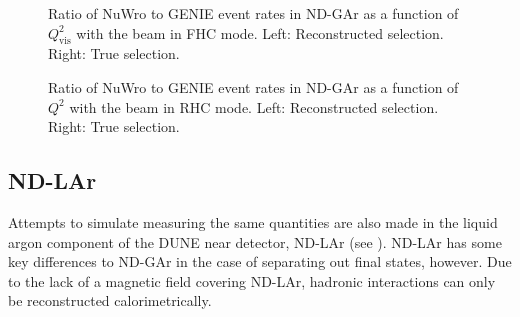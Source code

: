 \begin{figure}[h]
	\begin{minipage}[t]{.5\linewidth}
		\begin{adjustbox}{max totalsize=\linewidth, center}
			
		\end{adjustbox}
	\end{minipage}
 	\hfill
 	\begin{minipage}[t]{.5\linewidth}
 		\begin{adjustbox}{max totalsize=\linewidth, center}
 			
 		\end{adjustbox}
 	\end{minipage}
 	\caption[Comparison of NuWro and GENIE in $Q^{2}_{\textrm{vis}}$ for FHC]{Ratio of NuWro to GENIE event rates in ND-GAr as a function of $Q^{2}_{\textrm{vis}}$ with the beam in FHC mode. Left: Reconstructed selection. Right: True selection.}
 	\label{fig:Q2CompFhc}
\end{figure}

\begin{figure}[h]
	\begin{minipage}[t]{.5\linewidth}
		\begin{adjustbox}{max totalsize=\linewidth, center}
			
		\end{adjustbox}
	\end{minipage}
	\hfill
	\begin{minipage}[t]{.5\linewidth}
		\begin{adjustbox}{max totalsize=\linewidth, center}
			
		\end{adjustbox}
	\end{minipage}
	\caption[Comparison of NuWro and GENIE in $Q^{2}$ for RHC]{Ratio of NuWro to GENIE event rates in ND-GAr as a function of $Q^{2}$ with the beam in RHC mode. Left: Reconstructed selection. Right: True selection.}
	\label{fig:Q2CompRhc}
\end{figure}

\subsection{ND-LAr}
\label{sec:dune_ndrwt:pionMulti:lar}

Attempts to simulate measuring the same quantities are also made in the liquid argon component of the DUNE near detector, ND-LAr (see ).
ND-LAr has some key differences to ND-GAr in the case of separating out final states, however. 
Due to the lack of a magnetic field covering ND-LAr, hadronic interactions can only be reconstructed calorimetrically.

